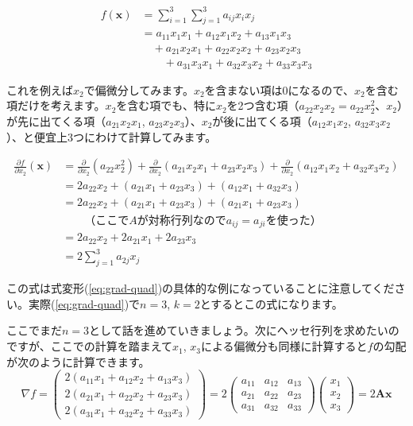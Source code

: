\documentclass[11pt]{article}
\begin{document}
\begin{align*}
  f(\bm{x})&=\sum_{i=1}^3 \sum_{j=1}^3 a_{ij} x_i x_j\\
  &= a_{11} x_1 x_1 + a_{12} x_1 x_2 + a_{13} x_1 x_3\\
  &\quad + a_{21} x_2 x_1 + a_{22} x_2 x_2 + a_{23} x_2 x_3\\
  &\qquad + a_{31} x_3 x_1 + a_{32} x_3 x_2 + a_{33} x_3 x_3
\end{align*}

これを例えば$x_2$で偏微分してみます。$x_2$を含まない項は0になるので、$x_2$を含む項だけを考えます。$x_2$を含む項でも、特に$x_2$を2つ含む項（$a_{22}x_2x_2 = a_{22}x_2^2$、$x_2$）が先に出てくる項（$a_{21} x_2 x_1$, $a_{23} x_2 x_3$）、$x_2$が後に出てくる項（$a_{12} x_1 x_2$, $a_{32} x_3 x_2$）、と便宜上3つにわけて計算してみます。

\begin{align*}
  \frac{\partial f}{\partial x_2}(\bm{x})&=
  \frac{\partial }{\partial x_2} (a_{22}x_2^2) +
  \frac{\partial }{\partial x_2}(a_{21} x_2 x_1 + a_{23} x_2 x_3) +
  \frac{\partial }{\partial x_2}(a_{12} x_1 x_2 + a_{32} x_3 x_2)\\
  &=2 a_{22} x_2 + (a_{21} x_1 + a_{23} x_3) + (a_{12} x_1 + a_{32} x_3)\\
  &=2 a_{22} x_2 + (a_{21} x_1 + a_{23} x_3) + (a_{21} x_1 + a_{23} x_3)\\
  &\qquad\text{（ここで$A$が対称行列なので$a_{ij}=a_{ji}$を使った）}\\
  &=2 a_{22} x_2 + 2a_{21} x_1 + 2a_{23} x_3\\
  &=2 \sum_{j=1}^{3} a_{2j} x_j
\end{align*}

この式は式変形(\ref{eq:grad-quad})の具体的な例になっていることに注意してください。実際(\ref{eq:grad-quad})で$n=3$, $k=2$とするとこの式になります。

ここでまだ$n=3$として話を進めていきましょう。次にヘッセ行列を求めたいのですが、ここでの計算を踏まえて$x_1$, $x_3$による偏微分も同様に計算すると$f$の勾配が次のように計算できます。
\[
\nabla f =
\begin{pmatrix}
  2 ( a_{11} x_1 + a_{12} x_2 + a_{13} x_3 )\\
  2 ( a_{21} x_1 + a_{22} x_2 + a_{23} x_3 )\\
  2 ( a_{31} x_1 + a_{32} x_2 + a_{33} x_3 )
\end{pmatrix}
=
2
\begin{pmatrix}
  a_{11} & a_{12} & a_{13}\\
  a_{21} & a_{22} & a_{23}\\
  a_{31} & a_{32} & a_{33}
\end{pmatrix}
\begin{pmatrix}
  x_1\\
  x_2\\
  x_3
\end{pmatrix}
=
2 \bm{A} \bm{x}
\]
\end{document}
